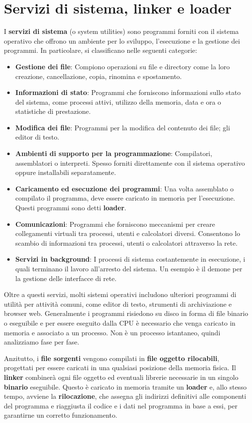 %

\section{Servizi di sistema, linker e loader}
I \textbf{servizi di sistema} (o system utilities) sono programmi forniti con il sistema operativo che offrono un ambiente per lo sviluppo, l'esecuzione e la gestione dei programmi. In particolare, si classificano nelle seguenti categorie: \begin{itemize}
	\item \textbf{Gestione dei file}: Compiono operazioni su file e directory come la loro creazione, cancellazione, copia, rinomina e spostamento.
	\item \textbf{Informazioni di stato}: Programmi che forniscono informazioni sullo stato del sistema, come processi attivi, utilizzo della memoria, data e ora o statistiche di prestazione.
	\item \textbf{Modifica dei file}: Programmi per la modifica del contenuto dei file; gli editor di testo.
	\item \textbf{Ambienti di supporto per la programmazione}: Compilatori, assemblatori o interpreti. Spesso forniti direttamente con il sistema operativo oppure installabili separatamente.
	\item \textbf{Caricamento ed esecuzione dei programmi}: Una volta assemblato o compilato il programma, deve essere caricato in memoria per l'esecuzione. Questi programmi sono detti \textbf{loader}.
	\item \textbf{Comunicazioni}: Programmi che forniscono meccanismi per creare collegamenti virtuali tra processi, utenti e calcolatori diversi. Consentono lo scambio di informazioni tra processi, utenti o calcolatori attraverso la rete.
	\item \textbf{Servizi in background}: I processi di sistema costantemente in esecuzione, i quali terminano il lavoro all'arresto del sistema. Un esempio è il demone per la gestione delle interfacce di rete.
\end{itemize}
\noindent Oltre a questi servizi, molti sistemi operativi includono ulteriori programmi di utilità per attività comuni, come editor di testo, strumenti di archiviazione e browser web. Generalmente i programmi risiedono su disco in forma di file binario o eseguibile e per essere eseguito dalla CPU è necessario che venga caricato in memoria e associato a un processo. Non è un processo istantaneo, quindi analizziamo fase per fase.\par
Anzitutto, i \textbf{file sorgenti} vengono compilati in \textbf{file oggetto rilocabili}, progettati per essere caricati in una qualsiasi posizione della memoria fisica. Il \textbf{linker} combinerà ogni file oggetto ed eventuali librerie necessarie in un singolo \textbf{binario} eseguibile. Questo è caricato in memoria tramite un \textbf{loader} e, allo stesso tempo, avviene la \textbf{rilocazione}, che assegna gli indirizzi definitivi alle componenti del programma e riaggiusta il codice e i dati nel programma in base a essi, per garantirne un corretto funzionamento.\newline

